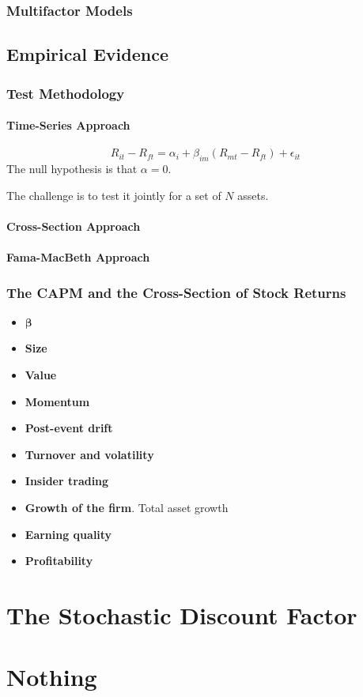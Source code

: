 \documentclass[11pt,green,twocol,citestyle=authoryear, bibstyle=authoryear]{elegantbook}
\begin{document}
\subsection{Multifactor Models}

\section{Empirical Evidence}

\subsection{Test Methodology}

\subsubsection{Time-Series Approach}
\begin{equation}\label{equ:capm-ts}
    R_{i t}-R_{f t}=\alpha_i+\beta_{i m} (R_{m t}-R_{f t})+\epsilon_{i t}
\end{equation}
The null hypothesis is that $ \alpha = 0 $. 
\begin{note}
    The challenge is to test it jointly for a set of $ N $ assets.
\end{note}

\subsubsection{Cross-Section Approach}

\subsubsection{Fama-MacBeth Approach}

\subsection{The CAPM and the Cross-Section of Stock Returns}
\begin{itemize}
    \item $ \mathbf{\beta} $
    \item \textbf{Size}  
    \item \textbf{Value}
    \item \textbf{Momentum}
    \item \textbf{Post-event drift}
    \item \textbf{Turnover and volatility}
    \item \textbf{Insider trading}
    \item \textbf{Growth of the firm}. Total asset growth
    \item \textbf{Earning quality}
    \item \textbf{Profitability}
\end{itemize}

\chapter{The Stochastic Discount Factor}


\printbibliography[heading=bibintoc, title=\ebibname]


\appendix


\chapter{Nothing}
\end{document}
